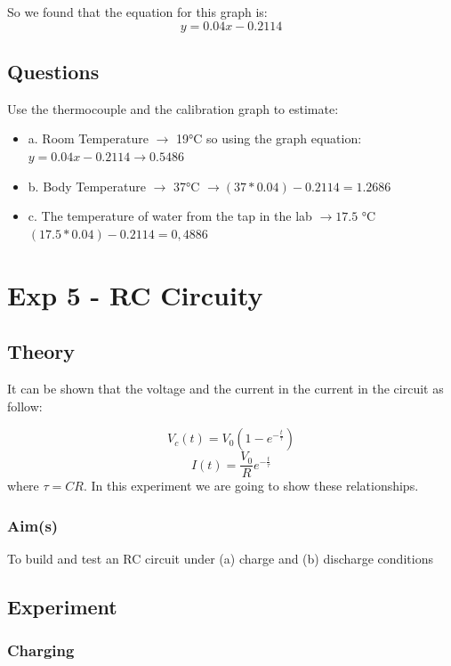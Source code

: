\documentclass[a4paper]{article}
\begin{document}
        So we found that the equation for this graph is:
        \[y = 0.04x - 0.2114\]

\subsection{Questions}

Use the thermocouple and the calibration graph to estimate:

\begin{itemize}
    \item a. Room Temperature $\rightarrow$ 19°C so using the graph equation:  $y = 0.04x - 0.2114 \rightarrow 0.5486$ 
    \item b. Body Temperature $\rightarrow$ 37°C $\rightarrow (37 * 0.04) - 0.2114 = 1.2686$
    \item c. The temperature of water from the tap in the lab $\rightarrow 17.5$ °C $(17.5 * 0.04) - 0.2114 = 0,4886 $ 
\end{itemize}

\section{Exp 5 - RC Circuity}

\subsection{Theory}

It can be shown that the voltage and the current in the current in the circuit as follow:

\[V_c(t) = V_0 (1 - e^{-\frac{t}{\tau}})\]
\[I(t) = \frac{V_0}{R}e^{-\frac{t}{\tau}}\]
where $\tau = CR$.
In this experiment we are going to show these relationships.


\subsubsection{Aim(s)}

To build and test an RC circuit under (a) charge and (b) discharge conditions

\subsection{Experiment}

\subsubsection{Charging}
\end{document}
